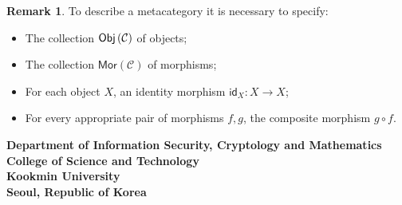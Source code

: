 \documentclass[11pt,openany]{article}
\newcommand{\footer}[1]{
\begin{flushright}
	\vspace{2em}
	\vspace{1em}
	\textcolor{TealBlue2}{\small\textbf{#1}}
\end{flushright}
}
\theoremstyle{definition}
\newtheorem{remark}{Remark}
\begin{document}
\newpage
\begin{remark}
	To describe a metacategory it is necessary to specify:
	\begin{itemize}
		\item The collection $\mathsf{Obj}\left(\mathcal{C}\right)$
		of objects;
		\item The collection $\mathsf{Mor}(\mathcal{C})$ of morphisms;
		\item For each object $X$, an identity morphism $\mathsf{id}_X:X\to X$;
		\item For every appropriate pair of morphisms $f,g$, the composite morphism $g\circ f$.
	\end{itemize}
\end{remark}

\footer{Department of Information Security, Cryptology and Mathematics\\
	College of Science and Technology\\
	Kookmin University \\
	Seoul, Republic of Korea}

\newpage

%
%
\end{document}
